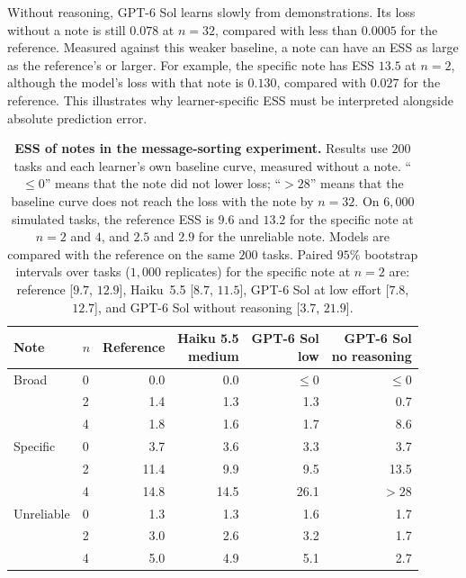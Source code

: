 \documentclass{article}
\theoremstyle{definition}
\begin{document}
Without reasoning, GPT-6 Sol learns slowly from demonstrations. Its loss without a note is still $0.078$ at $n=32$, compared with less than $0.0005$ for the reference. Measured against this weaker baseline, a note can have an ESS as large as the reference's or larger. For example, the specific note has ESS $13.5$ at $n=2$, although the model's loss with that note is $0.130$, compared with $0.027$ for the reference. This illustrates why learner-specific ESS must be interpreted alongside absolute prediction error.

\begin{table}[!htb]
\centering\small
\setlength{\tabcolsep}{4pt}
\caption{\textbf{ESS of notes in the message-sorting experiment.} Results use $200$ tasks and each learner's own baseline curve, measured without a note. ``$\leq0$'' means that the note did not lower loss; ``$>28$'' means that the baseline curve does not reach the loss with the note by $n=32$. On $6{,}000$ simulated tasks, the reference ESS is $9.6$ and $13.2$ for the specific note at $n=2$ and $4$, and $2.5$ and $2.9$ for the unreliable note. Models are compared with the reference on the same $200$ tasks. Paired $95\%$ bootstrap intervals over tasks ($1{,}000$ replicates) for the specific note at $n=2$ are: reference [$9.7$, $12.9$], Haiku~5.5 [$8.7$, $11.5$], GPT-6 Sol at low effort [$7.8$, $12.7$], and GPT-6 Sol without reasoning [$3.7$, $21.9$].}
\label{tab:semantic}
\vspace{3pt}
\begin{tabular}{llrrrr}
\toprule
Note & $n$ & Reference & \shortstack{Haiku 5.5\\medium} & \shortstack{GPT-6 Sol\\low} & \shortstack{GPT-6 Sol\\no reasoning} \\
\midrule
Broad & 0 & 0.0 & 0.0 & $\leq0$ & $\leq0$ \\
& 2 & 1.4 & 1.3 & 1.3 & 0.7 \\
& 4 & 1.8 & 1.6 & 1.7 & 8.6 \\
\addlinespace
Specific & 0 & 3.7 & 3.6 & 3.3 & 3.7 \\
& 2 & 11.4 & 9.9 & 9.5 & 13.5 \\
& 4 & 14.8 & 14.5 & 26.1 & $>28$ \\
\addlinespace
Unreliable & 0 & 1.3 & 1.3 & 1.6 & 1.7 \\
& 2 & 3.0 & 2.6 & 3.2 & 1.7 \\
& 4 & 5.0 & 4.9 & 5.1 & 2.7 \\
\bottomrule
\end{tabular}
\end{table}
\end{document}
